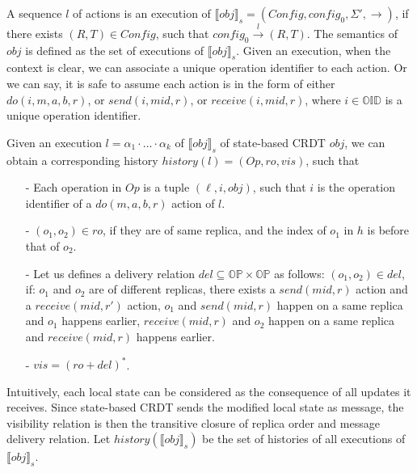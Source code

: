 {A sequence $l$ of actions is an execution of $\llbracket \mathit{obj} \rrbracket_s = (\mathit{Config},\mathit{config}_0,\Sigma',\rightarrow)$, if there exists $(R,T) \in \mathit{Config}$, such that $\mathit{config}_0 {\xrightarrow{ l }} (R,T)$. The semantics of $\mathit{obj}$ is defined as the set of executions of $\llbracket \mathit{obj} \rrbracket_s$. Given an execution, when the context is clear, we can associate a unique operation identifier to each action. Or we can say, it is safe to assume each action is in the form of either $\mathit{do}(i,m,a,b,r)$, or $\mathit{send}(i,\mathit{mid},r)$, or $\mathit{receive}(i,\mathit{mid},r)$, where $i \in \mathbb{OID}$ is a unique operation identifier.








Given an execution $l = \alpha_1 \cdot \ldots \cdot \alpha_k$ of $\llbracket \mathit{obj} \rrbracket_s$ of state-based CRDT $\mathit{obj}$, we can obtain a corresponding history $\mathit{history}(l) = (\mathit{Op},\mathit{ro},\mathit{vis})$, such that

\begin{itemize}
\setlength{\itemsep}{0.5pt}
\item[-] Each operation in $\mathit{Op}$ is a tuple $(\ell,i,\mathit{obj})$, such that $i$ is the operation identifier of a $\mathit{do}(m,a,b,r)$ action of $l$.

\item[-] $(o_1,o_2) \in \mathit{ro}$, if they are of same replica, and the index of $o_1$ in $h$ is before that of $o_2$.

\item[-] Let us defines a delivery relation $\mathit{del} \subseteq \mathbb{OP} \times \mathbb{OP}$ as follows: $(o_1,o_2) \in \mathit{del}$, if: $o_1$ and $o_2$ are of different replicas, there exists a $\mathit{send}(\mathit{mid},r)$ action and a $\mathit{receive}(\mathit{mid},r')$ action, $o_1$ and $\mathit{send}(\mathit{mid},r)$ happen on a same replica and $o_1$ happens earlier, $\mathit{receive}(\mathit{mid},r)$ and $o_2$ happen on a same replica and $\mathit{receive}(\mathit{mid},r)$ happens earlier.

\item[-] $\mathit{vis} = (\mathit{ro}+\mathit{del})^*$.
\end{itemize}

Intuitively, each local state can be considered as the consequence of all updates it receives. Since state-based CRDT sends the modified local state as message, the visibility relation is then the transitive closure of replica order and message delivery relation. Let $\mathit{history}(\llbracket \mathit{obj} \rrbracket_s)$ be the set of histories of all executions of $\llbracket \mathit{obj} \rrbracket_s$.






}
